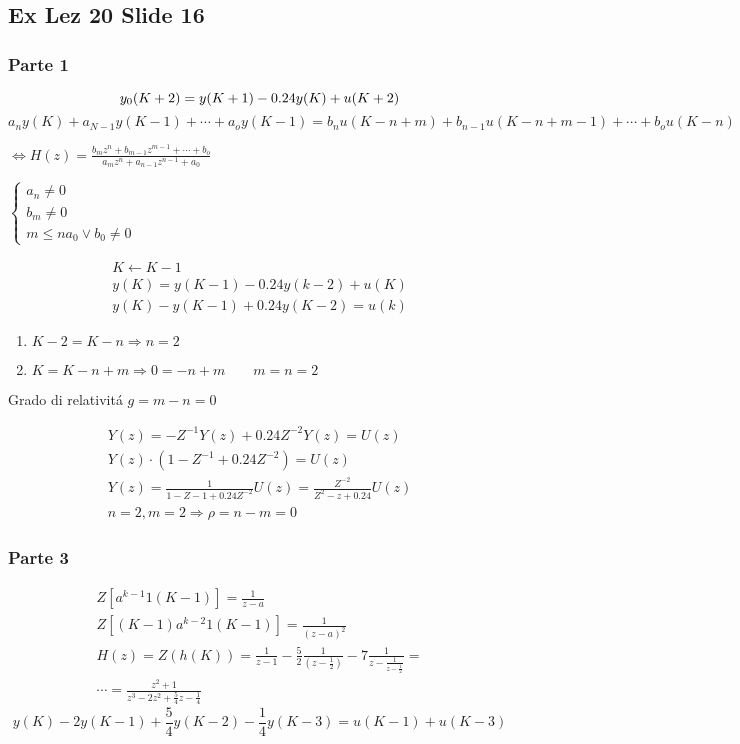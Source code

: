 \subsection{Ex Lez 20 Slide 16}

\subsubsection{Parte 1}

\[
    y_0(K+2) = y(K+1) - 0.24y(K) + u(K+2)\\
\]
\bigbreak
\(
    a_ny(K) + a_{N-1}y(K-1) + \cdots +a_o y(K-1) = b_n u(K-n +m) + b_{n-1} u(K-n+m-1) + \cdots + b_o u(K-n)
\)

\(
\Leftrightarrow H(z) = \frac{b_mz^{n} + b_{m-1}z^{m-1}+ \cdots + b_o}{a_mz^n + a_{n-1}z^{n-1}+a_0}
\)
\bigbreak

\(
\begin{cases}
a_n \neq 0\\
b_m \neq 0 \\
m \le n
a_0 \lor b_0 \neq 0
\end{cases}
\)

\[
\begin{split}
K \leftarrow K-1\\
y(K) = y(K-1) - 0.24 y(k-2) + u(K)\\
y(K) - y(K-1) + 0.24 y(K-2) = u(k)
\end{split}
\]

\begin{enumerate}
    \item $K-2 = K - n \Rightarrow n = 2$
    \item $K = K - n + m \Rightarrow 0 = -n + m \qquad m = n = 2$
\end{enumerate}


Grado di relativit\'a $g = m-n = 0$

\begin{align*}
Y(z) = -Z^{-1} Y(z) + 0.24 Z^{-2} Y(z) = U(z)\\
Y(z) \cdot (1-Z^{-1} + 0.24 Z^{-2}) =  U(z)\\
Y(z) = \frac{1}{1-Z-1 + 0.24 Z^{-2}}U(z) = \frac{Z^{-2}}{Z^2 - z + 0.24} U(z)\\
n = 2, m=2 \Rightarrow \rho = n - m = 0
\end{align*}

\subsubsection{Parte 3}
\[
\begin{split}
    Z[ a^{k-1} 1(K-1)] = \frac{1}{z-a}\\
    Z[ (K-1) a^{k-2} 1(K-1)] = \frac{1}{(z-a)^2}\\
    H(z) = Z(h(K)) = \frac{1}{z-1} -
    \frac{5}{2} \frac{1}{\left( z - \frac{1}{2}\right)} - 7 \frac{1}{z-\frac{1}{z - \frac{1}{2}}} = \\
    \cdots = \frac{z^2 +1}{z^3 -2z^2 + \frac{5}{4} z - \frac{1}{4}}
\end{split}
\]
\[
    y(K) - 2y(K-1) + \frac{5}{4}y(K-2) - \frac{1}{4}y(K-3) = u(K-1) + u(K-3)
\]

